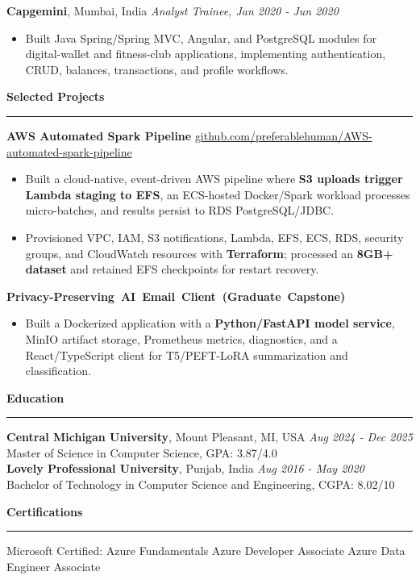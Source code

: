 \documentclass[11pt,letterpaper]{article}
\newcommand{\ressection}[1]{\Needspace{6\baselineskip}\vspace{8pt}\par\textbf{#1}\par\vspace{2pt}\hrule\vspace{5pt}}
\begin{document}
\textbf{Capgemini}, Mumbai, India \hfill \textit{Analyst Trainee, Jan 2020 - Jun 2020}
\begin{itemize}
  \item Built Java Spring/Spring MVC, Angular, and PostgreSQL modules for digital-wallet and fitness-club applications, implementing authentication, CRUD, balances, transactions, and profile workflows.
\end{itemize}

\ressection{Selected Projects}
\textbf{AWS Automated Spark Pipeline} \hfill \href{https://github.com/preferablehuman/AWS-automated-spark-pipeline}{github.com/preferablehuman/AWS-automated-spark-pipeline}
\begin{itemize}
  \item Built a cloud-native, event-driven AWS pipeline where \textbf{S3 uploads trigger Lambda staging to EFS}, an ECS-hosted Docker/Spark workload processes micro-batches, and results persist to RDS PostgreSQL/JDBC.
  \item Provisioned VPC, IAM, S3 notifications, Lambda, EFS, ECS, RDS, security groups, and CloudWatch resources with \textbf{Terraform}; processed an \textbf{8GB+ dataset} and retained EFS checkpoints for restart recovery.
\end{itemize}
\vskip 6pt
\hbox{\textbf{Privacy-Preserving AI Email Client (Graduate Capstone)}}
\begin{itemize}
  \item Built a Dockerized application with a \textbf{Python/FastAPI model service}, MinIO artifact storage, Prometheus metrics, diagnostics, and a React/TypeScript client for T5/PEFT-LoRA summarization and classification.
\end{itemize}

\ressection{Education}
\textbf{Central Michigan University}, Mount Pleasant, MI, USA \hfill \textit{Aug 2024 - Dec 2025}\\
Master of Science in Computer Science, GPA: 3.87/4.0\\[2pt]
\textbf{Lovely Professional University}, Punjab, India \hfill \textit{Aug 2016 - May 2020}\\
Bachelor of Technology in Computer Science and Engineering, CGPA: 8.02/10

\ressection{Certifications}
Microsoft Certified: Azure Fundamentals \textbar{} Azure Developer Associate \textbar{} Azure Data Engineer Associate
\end{document}
